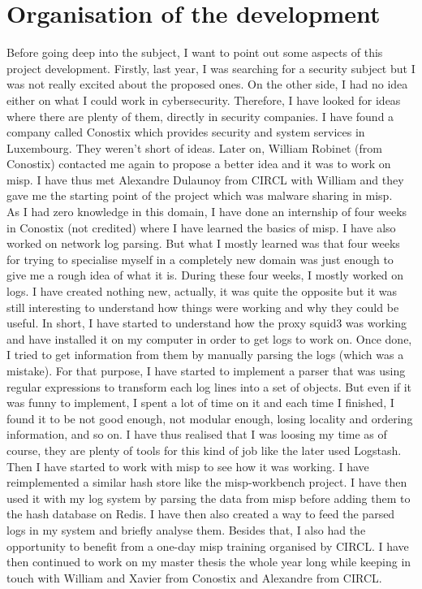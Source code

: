 \documentclass{eplmastersthesis}
\begin{document}
\section{Organisation of the development}
Before going deep into the subject, I want to point out some aspects of this project development.
Firstly, last year, I was searching for a security subject but I was not really excited about the proposed ones. On the other side, I had no idea either on what I could work in cybersecurity. Therefore, I have looked for ideas where there are plenty of them, directly in security companies.
I have found a company called Conostix which provides security and system services in Luxembourg.
They weren't short of ideas. Later on, William Robinet (from Conostix) contacted me again to propose a better idea and it was to work on \gls{misp}. I have thus met Alexandre Dulaunoy from CIRCL with William and they gave me the starting point of the project which was malware sharing in \gls{misp}.\\

As I had zero knowledge in this domain, I have done an internship of four weeks in Conostix (not credited) where I have learned the basics of \gls{misp}. I have also worked on network log parsing. But what I mostly learned was that four weeks for trying to specialise myself in a completely new domain was just enough to give me a rough idea of what it is.
During these four weeks, I mostly worked on logs. I have created nothing new, actually, it was quite the opposite but it was still interesting to understand how things were working and why they could be useful. 
In short, I have started to understand how the proxy squid3 was working and have installed it on my computer in order to get logs to work on. Once done, I tried to get information from them by manually parsing the logs (which was a mistake). For that purpose, I have started to implement a parser that was using regular expressions to transform each log lines into a set of objects. But even if it was funny to implement, I spent a lot of time on it and each time I finished, I found it to be not good enough, not modular enough, losing locality and ordering information, and so on. I have thus realised that I was loosing my time as of course, they are plenty of tools for this kind of job like the later used Logstash. Then I have started to work with \gls{misp} to see how it was working. I have reimplemented a similar hash store like the misp-workbench project. I have then used it with my log system by parsing the data from \gls{misp} before adding them to the hash database on Redis. I have then also created a way to feed the parsed logs in my system and briefly analyse them.
Besides that, I also had the opportunity to benefit from a one-day \gls{misp} training organised by CIRCL.
I have then continued to work on my master thesis the whole year long while keeping in touch with William and Xavier from Conostix and Alexandre from CIRCL.
\end{document}
